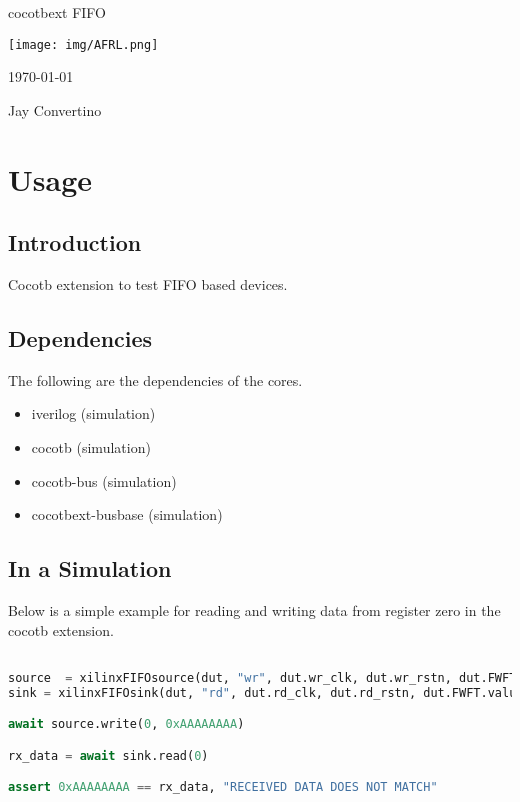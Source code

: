 \begin{titlepage}
  \begin{center}

  {\Huge cocotbext FIFO}

  \vspace{25mm}

  \texttt{[image: img/AFRL.png]}

  \vspace{25mm}

  \today

  \vspace{15mm}

  {\Large Jay Convertino}

  \end{center}
\end{titlepage}

\tableofcontents

\newpage

\section{Usage}

\subsection{Introduction}

\par
Cocotb extension to test FIFO based devices.

\subsection{Dependencies}

\par
The following are the dependencies of the cores.

\begin{itemize}
  \item iverilog (simulation)
  \item cocotb (simulation)
  \item cocotb-bus (simulation)
  \item cocotbext-busbase (simulation)
\end{itemize}

\subsection{In a Simulation}
\par
Below is a simple example for reading and writing data from register zero in the cocotb extension.
\begin{lstlisting}[language=Python]

source  = xilinxFIFOsource(dut, "wr", dut.wr_clk, dut.wr_rstn, dut.FWFT.value != 0)
sink = xilinxFIFOsink(dut, "rd", dut.rd_clk, dut.rd_rstn, dut.FWFT.value != 0)

await source.write(0, 0xAAAAAAAA)

rx_data = await sink.read(0)

assert 0xAAAAAAAA == rx_data, "RECEIVED DATA DOES NOT MATCH"

\end{lstlisting}


